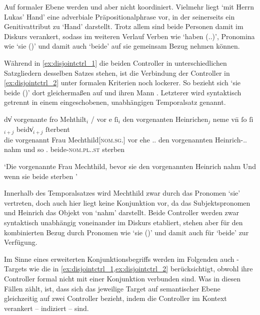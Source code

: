 Auf formaler Ebene werden  und  aber nicht koordiniert.
Vielmehr liegt  `mit Herrn Lukas' Hand' eine
adverbiale Präpositionalphrase vor, in der  seinerseits ein
Genitivattribut zu  `Hand' darstellt. Trotz allem sind beide
Personen damit im Diskurs verankert, sodass im weiteren Verlauf Verben wie
 `haben (\Tpl.\Ind.\Prs)', Pronomina wie  `sie
(\Pl)' und damit auch  `beide' auf sie gemeinsam Bezug nehmen
können.

Während in \cref{ex:disjointctrl_1} die beiden Controller in unterschiedlichen
Satzgliedern desselben Satzes stehen, ist die Verbindung der Controller in
\cref{ex:disjointctrl_2} unter formalen Kriterien noch lockerer. So bezieht sich
 `sie beide (\N)' dort gleichermaßen auf
 und ihren Mann . Letzterer wird
syntaktisch getrennt in einem eingeschobenen, unabhängigen Temporalsatz
genannt.

\begin{exe}
\ex\label{ex:disjointctrl_2}
	\gll dv̓ vorgenante fro Mehthilt$_i$ / vor e ſi$_i$ den
			vorgenanten Heinrichen$_j$ neme \textelp{} vn̄ ſo
			ſi$_{i+j}$ beidv̍$_{i+j}$ ſterbent \textelp{}
			\\
		die vorgenannt Frau Mechthild[\textsc{nom.sg.\FemF}] {} vor ehe
			\Tsg.\FemF.\Nom{} den vorgenannten Heinrich-\Acc.\Sg.\MascM{} nahm {}
			und so \Tpl\subMF.\Nom{} beide-\textsc{nom.pl.\NeutMF.st} sterben {}
			\\
	\begin{taggedline}{\parencites(Freiburg i.\,Br., 1294)[\pno~2008, 253.30--39]{cao3}}
		\trans `Die vorgenannte Frau Mechthild, bevor sie den
			vorgenannten Heinrich  nahm \textelp{} Und wenn
			sie beide sterben \textelp{}%
			'
	\end{taggedline}
\end{exe}

Innerhalb des Temporalsatzes wird Mechthild zwar durch das Pronomen 
`sie' vertreten, doch auch hier liegt keine Konjunktion vor, da 
das Subjektspronomen und Heinrich das Objekt von  `nahm'
darstellt. Beide Controller werden zwar syntaktisch unabhängig voneinander im
Diskurs etabliert, stehen aber für den kombinierten Bezug durch Pronomen wie
 `sie (\Pl)' und damit auch für 
`beide' zur Verfügung.

Im Sinne eines erweiterten Konjunktionsbegriffs werden im Folgenden auch
-Targets wie die in \cref{ex:disjointctrl_1,ex:disjointctrl_2}
berücksichtigt, obwohl ihre Controller formal nicht mit einer Konjunktion
verbunden sind. Was in diesen Fällen zählt, ist, dass sich das jeweilige Target
auf semantischer Ebene gleichzeitig auf zwei Controller bezieht, indem die
Controller im Kontext verankert -- indiziert -- sind.

